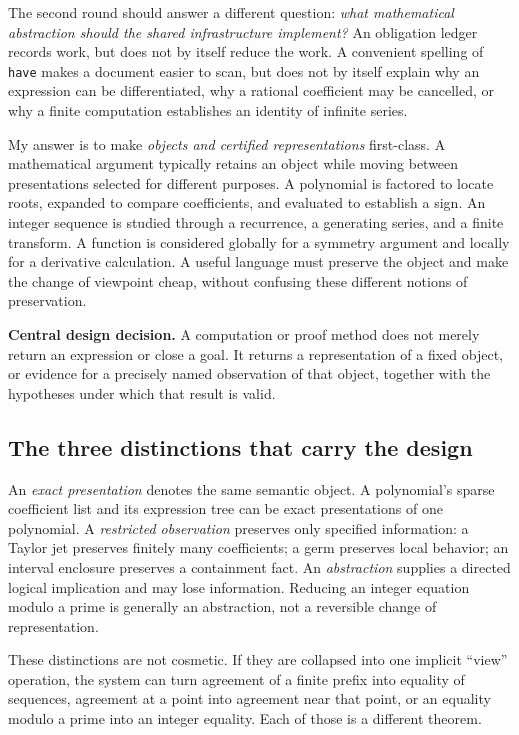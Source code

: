 \documentclass[11pt,a4paper]{article}
\newcommand{\code}[1]{\nolinkurl{#1}}
\theoremstyle{definition}
\begin{document}
The second round should answer a different question: \emph{what mathematical
abstraction should the shared infrastructure implement?} An obligation ledger
records work, but does not by itself reduce the work. A convenient spelling of
\code{have} makes a document easier to scan, but does not by itself explain why
an expression can be differentiated, why a rational coefficient may be cancelled,
or why a finite computation establishes an identity of infinite series.

My answer is to make \emph{objects and certified representations} first-class.
A mathematical argument typically retains an object while moving between
presentations selected for different purposes. A polynomial is factored to locate
roots, expanded to compare coefficients, and evaluated to establish a sign. An
integer sequence is studied through a recurrence, a generating series, and a
finite transform. A function is considered globally for a symmetry argument and
locally for a derivative calculation. A useful language must preserve the object
and make the change of viewpoint cheap, without confusing these different
notions of preservation.

\begin{designbox}
\textbf{Central design decision.} A computation or proof method does not merely
return an expression or close a goal. It returns a representation of a fixed
object, or evidence for a precisely named observation of that object, together
with the hypotheses under which that result is valid.
\end{designbox}

\subsection{The three distinctions that carry the design}
An \emph{exact presentation} denotes the same semantic object. A polynomial's
sparse coefficient list and its expression tree can be exact presentations of
one polynomial. A \emph{restricted observation} preserves only specified
information: a Taylor jet preserves finitely many coefficients; a germ preserves
local behavior; an interval enclosure preserves a containment fact. An
\emph{abstraction} supplies a directed logical implication and may lose information.
Reducing an integer equation modulo a prime is generally an abstraction, not a
reversible change of representation.

These distinctions are not cosmetic. If they are collapsed into one implicit
``view'' operation, the system can turn agreement of a finite prefix into equality
of sequences, agreement at a point into agreement near that point, or an equality
modulo a prime into an integer equality. Each of those is a different theorem.
\end{document}
